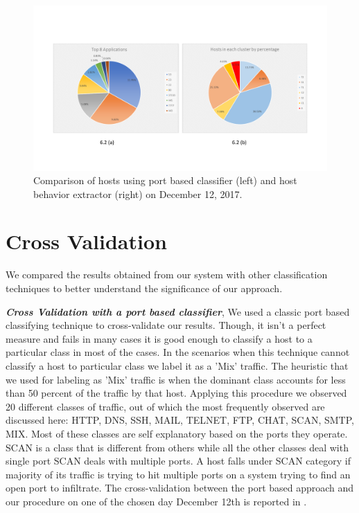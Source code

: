 \begin{figure}[t]
	\centerline{\includegraphics[trim=2cm 2cm 2cm 2cm, scale = 0.5]{dec12-port-behaviors.pdf}}
	\caption{Comparison of hosts using port based classifier (left) and host behavior extractor (right) on December 12, 2017.}%
\end{figure}


\section{Cross Validation} \label{cross_validation}
We compared the results obtained from our system with other classification techniques to better understand the significance of our approach.

\textbf{\textit{Cross Validation with a port based classifier}}, We used a classic port based classifying technique to cross-validate our results. Though, it isn't a perfect measure and fails in many cases it is good enough to classify a host to a particular class in most of the cases.
In the scenarios when this technique cannot classify a host to particular class we label it as a 'Mix' traffic. The heuristic that we used for labeling as 'Mix' traffic is when the dominant class accounts for less than 50 percent of the traffic by that host. Applying this procedure we observed 20 different classes of traffic, out of which the most frequently observed are discussed here: HTTP, DNS, SSH, MAIL, TELNET, FTP, CHAT, SCAN, SMTP, MIX. Most of these classes are self explanatory based on the ports they operate. SCAN is a class that is different from others while all the other classes deal with single port SCAN deals with multiple ports. A host falls under SCAN category if majority of its traffic is trying to hit multiple ports on a system trying to find an open port to infiltrate. The cross-validation between the port based approach and our procedure on one of the chosen day December 12th is reported in .

